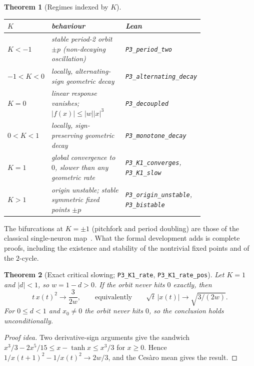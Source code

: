 \documentclass[11pt]{article}
\newtheorem{theorem}{Theorem}
\theoremstyle{definition}
\theoremstyle{remark}
\newcommand{\lean}[1]{\texttt{\small #1}}
\begin{document}
\begin{theorem}[Regimes indexed by $K$]\label{thm:regimes}
\leavevmode
\begin{center}
\small\upshape
\begin{tabular}{@{}l p{0.47\linewidth} p{0.31\linewidth}@{}}
\toprule
$K$ & behaviour & Lean \\
\midrule
$K<-1$ & stable period-2 orbit $\pm p$ (non-decaying oscillation) & \lean{P3\_period\_two} \\
$-1<K<0$ & locally, alternating-sign geometric decay & \lean{P3\_alternating\_decay} \\
$K=0$ & linear response vanishes; $|f(x)|\le|w||x|^3$ & \lean{P3\_decoupled} \\
$0<K<1$ & locally, sign-preserving geometric decay & \lean{P3\_monotone\_decay} \\
$K=1$ & global convergence to $0$, slower than any geometric rate & \lean{P3\_K1\_converges}, \lean{P3\_K1\_slow} \\
$K>1$ & origin unstable; stable symmetric fixed points $\pm p$ & \lean{P3\_origin\_unstable}, \lean{P3\_bistable} \\
\bottomrule
\end{tabular}
\end{center}
\end{theorem}

The bifurcations at $K=\pm1$ (pitchfork and period doubling) are those of the classical single-neuron
map~\cite{pasemann1993}. What the formal development adds is complete proofs, including the existence
and stability of the nontrivial fixed points and of the $2$-cycle.

\begin{theorem}[Exact critical slowing; \lean{P3\_K1\_rate}, \lean{P3\_K1\_rate\_pos}]\label{thm:critical}
Let $K=1$ and $|d|<1$, so $w=1-d>0$. If the orbit never hits $0$ exactly, then
\[
  t\,x(t)^2\longrightarrow\frac{3}{2w},\qquad\text{equivalently}\qquad \sqrt t\,|x(t)|\to\sqrt{3/(2w)}.
\]
For $0\le d<1$ and $x_0\neq0$ the orbit never hits $0$, so the conclusion holds unconditionally.
\end{theorem}

\begin{proof}[Proof idea]
Two derivative-sign arguments give the sandwich $x^3/3-2x^5/15\le x-\tanh x\le x^3/3$ for $x\ge0$.
Hence $1/x(t+1)^2-1/x(t)^2\to 2w/3$, and the Cesàro mean gives the result.
\end{proof}
\end{document}
